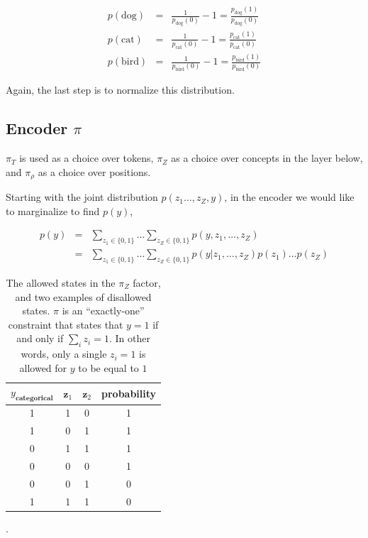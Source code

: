 \documentclass{article}
\begin{document}
\begin{eqnarray}
    p(\text{dog}) &=& \frac{1}{p_{\text{dog}}(0)} - 1 = \frac{p_{\text{dog}}(1)}{p_{\text{dog}}(0)} \nonumber \\
    p(\text{cat}) &=& \frac{1}{p_{\text{cat}}(0)} - 1 = \frac{p_{\text{cat}}(1)}{p_{\text{cat}}(0)} \nonumber \\
    p(\text{bird}) &=& \frac{1}{p_{\text{bird}}(0)} - 1 = \frac{p_{\text{bird}}(1)}{p_{\text{bird}}(0)}
\end{eqnarray}

Again, the last step is to normalize this distribution.



\subsection{Encoder $\pi$}

$\pi_T$ is used as a choice over tokens, $\pi_Z$ as a choice over concepts in the layer below, and $\pi_\rho$ as a choice over positions.

Starting with the joint distribution $p(z_1 \ldots, z_Z, y)$, in the encoder we would like to marginalize to find $p(y)$,

\begin{eqnarray}
    p(y) &=& \sum_{z_1 \in \{0,1\}}\ldots \sum_{z_Z \in \{0,1\}} p(y, z_1, \ldots, z_Z) \nonumber \\
    &=& \sum_{z_1 \in \{0,1\}}\ldots \sum_{z_Z \in \{0,1\}} p(y|z_1, \ldots, z_Z) p(z_1) \ldots p(z_Z)
\end{eqnarray}

\begin{table}[H]
    \setlength{\extrarowheight}{5pt}
    \centering
    \begin{tabular}{c|c|c|c}
        \hline\hline
        $y_{\textbf{categorical}}$ & $\textbf{z}_1$  & $\textbf{z}_2$ & \textbf{probability} \\[1ex]
        \hline
        1    & 1          & 0          & 1 \\
        1    & 0          & 1          & 1 \\
        0    & 1          & 1          & 1 \\
        0    & 0          & 0          & 1 \\
        0    & 0          & 1          & 0 \\
        1    & 1          & 1          & 0 \\[1ex]
        \hline
    \end{tabular}
    \caption{The allowed states in the $\pi_Z$ factor, and two examples of disallowed states. $\pi$ is an ``exactly-one'' constraint that states that $y=1$ if and  only if $\sum_i z_i = 1$.  In other words, only a single $z_i=1$ is allowed for $y$ to be equal to $1$}. 
    \label{tab:X1}
\end{table}
\end{document}
